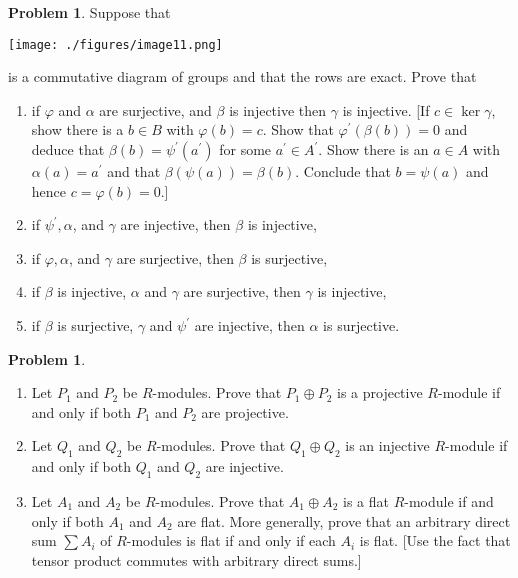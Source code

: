 \documentclass{amsart}
\numberwithin{equation}{section}
\theoremstyle{definition}
\newtheorem{problem}[thm]{Problem}
\begin{document}
\begin{problem}
 Suppose that
 \begin{center}
  \texttt{[image: ./figures/image11.png]}
\end{center}
is a commutative diagram of groups and that the rows are exact. Prove that
\begin{enumerate}
\item if \(\varphi\) and \(\alpha\) are surjective, and \(\beta\) is injective then \(\gamma\) is injective. [If \(c \in \operatorname{ker} \gamma\), show there is a \(b \in B\) with \(\varphi(b)=c\). Show that \(\varphi^{\prime}(\beta(b))=0\) and deduce that \(\beta(b)=\psi^{\prime}\left(a^{\prime}\right)\) for some \(a^{\prime} \in A^{\prime}\). Show there is an \(a \in A\) with \(\alpha(a)=a^{\prime}\) and that \(\beta(\psi(a))=\beta(b)\). Conclude that \(b=\psi(a)\) and hence \(c=\varphi(b)=0\).]
\item if \(\psi^{\prime}, \alpha\), and \(\gamma\) are injective, then \(\beta\) is injective,
\item if \(\varphi, \alpha\), and \(\gamma\) are surjective, then \(\beta\) is surjective,
\item if \(\beta\) is injective, \(\alpha\) and \(\gamma\) are surjective, then \(\gamma\) is injective,
\item if \(\beta\) is surjective, \(\gamma\) and \(\psi^{\prime}\) are injective, then \(\alpha\) is surjective.
\end{enumerate}


\end{problem}


\begin{problem}
  \begin{enumerate}
  \item Let \(P_1\) and \(P_2\) be \(R\)-modules. Prove that \(P_1 \oplus P_2\) is a projective \(R\)-module if and only if both \(P_1\) and \(P_2\) are projective.
  \item Let \(Q_1\) and \(Q_2\) be \(R\)-modules. Prove that \(Q_1 \oplus Q_2\) is an injective \(R\)-module if and only if both \(Q_1\) and \(Q_2\) are injective.
  \item Let \(A_1\) and \(A_2\) be \(R\)-modules. Prove that \(A_1 \oplus A_2\) is a flat \(R\)-module if and only if both \(A_1\) and \(A_2\) are flat. More generally, prove that an arbitrary direct sum \(\sum A_i\) of \(R\)-modules is flat if and only if each \(A_i\) is flat. [Use the fact that tensor product commutes with arbitrary direct sums.]
  \end{enumerate}
\end{problem}
\end{document}
